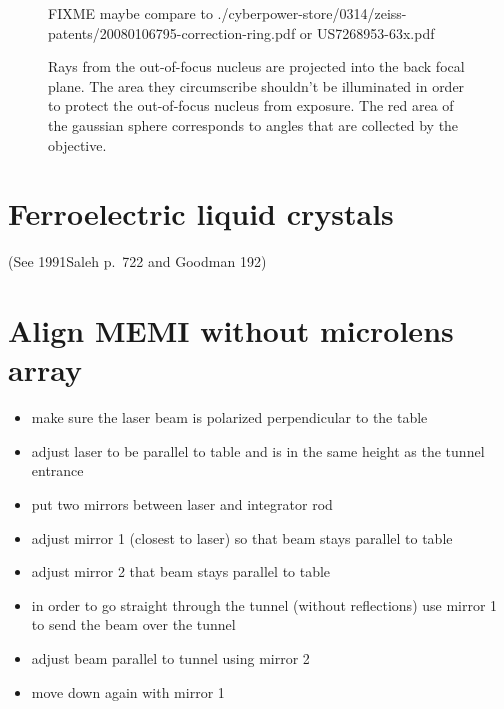\begin{figure}[!hbt]
  \centering
  \caption{Rays from the out-of-focus nucleus are projected into the
    back focal plane. The area they circumscribe shouldn't be
    illuminated in order to protect the out-of-focus nucleus from
    exposure. The red area of the gaussian sphere corresponds to
    angles that are collected by the objective.}
  \label{fig:rays-from-out-of-focus}

FIXME maybe compare to ./cyberpower-store/0314/zeiss-patents/20080106795-correction-ring.pdf 
or US7268953-63x.pdf

\end{figure}


\newpage
\section{Ferroelectric liquid crystals}
(See 1991Saleh p.~722 and Goodman 192)

\section{Align MEMI without microlens array}
\begin{itemize}
\item make sure the laser beam is polarized perpendicular to the table
\item adjust laser to be parallel to table and is in the same height
  as the tunnel entrance
\item put two mirrors between laser and integrator rod
\item adjust mirror 1 (closest to laser) so that beam stays parallel to table
\item adjust mirror 2 that beam stays parallel to table
\item in order to go straight through the tunnel (without reflections)
  use mirror 1 to send the beam over the tunnel
\item adjust beam parallel to tunnel using mirror 2
\item move down again with mirror 1

\end{itemize}
